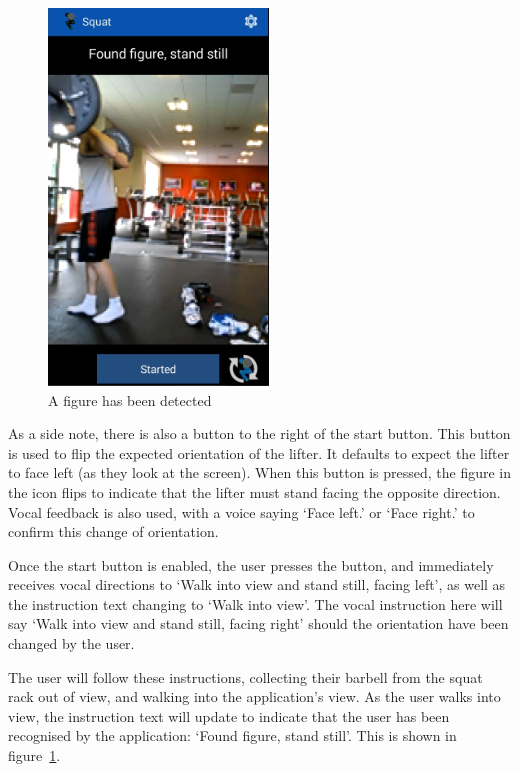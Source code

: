 \begin{figure}[H]
    \centering
	\includegraphics[height=10cm]{application/images/foundfigure}
\caption{A figure has been detected}
\label{fig:foundfigure}
\end{figure}

As a side note, there is also a button to the right of the start button. This button is used to flip the expected orientation of the lifter. It defaults to expect the lifter to face left (as they look at the screen). When this button is pressed, the figure in the icon flips to indicate that the lifter must stand facing the opposite direction. Vocal feedback is also used, with a voice saying `Face left.' or `Face right.' to confirm this change of orientation.

Once the start button is enabled, the user presses the button, and immediately receives vocal directions to `Walk into view and stand still, facing left', as well as the instruction text changing to `Walk into view'. The vocal instruction here will say `Walk into view and stand still, facing right' should the orientation have been changed by the user.

The user will follow these instructions, collecting their barbell from the squat rack out of view, and walking into the application's view. As the user walks into view, the instruction text will update to indicate that the user has been recognised by the application: `Found figure, stand still'. This is shown in figure~\ref{fig:foundfigure}.

